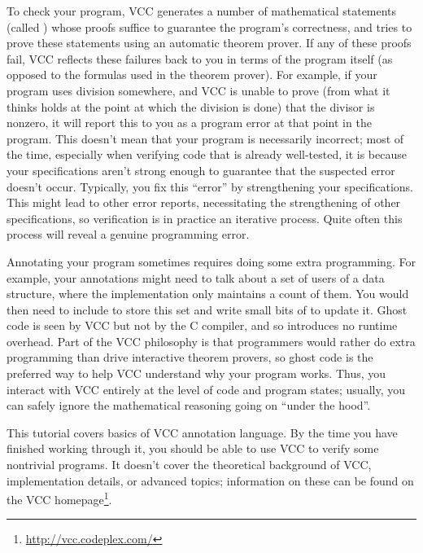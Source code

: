 To check your program, VCC generates a number of mathematical
statements (called ) whose proofs
suffice to guarantee the program's correctness, and tries to prove
these statements using an automatic theorem prover. If any of these
proofs fail, VCC reflects these failures back to you in terms of the
program itself (as opposed to the formulas used in the theorem prover).
For example, if your program uses division
somewhere, and VCC is unable to prove (from what it thinks holds at the
point at which the division is done) that the divisor is nonzero, it
will report this to you as a program error at that point in the
program. 
This doesn't mean that your program is necessarily incorrect;
most of the time, especially when verifying code that is already well-tested,
it is because your specifications aren't strong
enough to guarantee that the suspected error doesn't occur.
Typically, you fix this ``error'' by strengthening your
specifications. This might lead to other error reports, necessitating
the strengthening of other specifications, so verification is in
practice an iterative process.  
Quite often this process will reveal a genuine programming error.

Annotating your program sometimes requires doing some extra
programming.  For example, your annotations might need to talk about a
set of users of a data structure, where the implementation only
maintains a count of them.  You would then need to include  to store this set and write small bits of  to
update it.  Ghost code is seen by VCC but not by the C compiler, and
so introduces no runtime overhead. Part of the VCC philosophy is that
programmers would rather do extra programming than drive interactive
theorem provers, so ghost code is the preferred way to help VCC
understand why your program works.  Thus, you interact with VCC
entirely at the level of code and program states; usually, you can
safely ignore the mathematical reasoning going on ``under the hood''.

This tutorial covers basics of VCC annotation language. By the time
you have finished working through it, you should be able to use VCC to
verify some nontrivial programs. It doesn't cover the theoretical
background of VCC, implementation details, or advanced topics;
information on these can be found on the VCC
homepage\footnote{\url{http://vcc.codeplex.com/}}.

